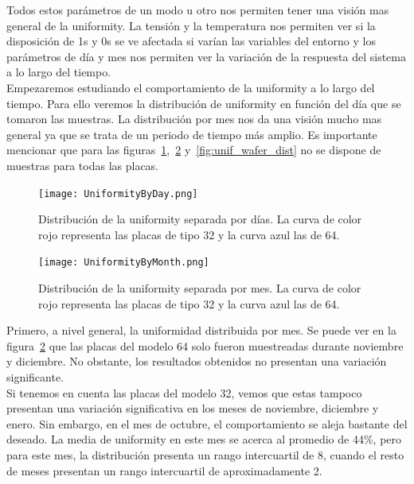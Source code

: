 \documentclass[spanish]{template/minim}
\begin{document}
Todos estos parámetros de un modo u otro nos permiten tener una visión mas general de la uniformity. La tensión y la temperatura nos permiten ver si la disposición de 1s y 0s se ve afectada si varían las variables del entorno y los parámetros de día y mes nos permiten ver la variación de la respuesta del sistema a lo largo del tiempo.\\

Empezaremos estudiando el comportamiento de la uniformity a lo largo del tiempo. Para ello veremos la distribución de uniformity en función del día que se tomaron las muestras. La distribución por mes nos da una visión mucho mas general ya que se trata de un periodo de tiempo más amplio. Es importante mencionar que para las figuras~\ref{fig:unif_day_dist},~\ref{fig:unif_month_dist} y~\ref{fig:unif_wafer_dist} no se dispone de muestras para todas las placas.\\

\begin{fullwidth}
\begin{figure}[H]
    \centering
    \texttt{[image: UniformityByDay.png]}
    \caption[Distribución de uniformity por día]{
            Distribución de la uniformity separada por días. La curva de color rojo representa las placas de tipo 32 y la curva azul las de 64.\label{fig:unif_day_dist}
        }
\end{figure}
\end{fullwidth}

\begin{fullwidth}
\begin{figure}[H]
    \centering
    \texttt{[image: UniformityByMonth.png]}
    \caption[Distribución de uniformity por mes]{
            Distribución de la uniformity separada por mes. La curva de color rojo representa las placas de tipo 32 y la curva azul las de 64.\label{fig:unif_month_dist}
        }
\end{figure}
\end{fullwidth}


Primero, a nivel general, la uniformidad distribuida por mes. Se puede ver en la figura~\ref{fig:unif_month_dist} que las placas del modelo 64 solo fueron muestreadas durante noviembre y diciembre. No obstante, los resultados obtenidos no presentan una variación significante.\\

Si tenemos en cuenta las placas del modelo 32, vemos que estas tampoco presentan una variación significativa en los meses de noviembre, diciembre y enero. Sin embargo, en el mes de octubre, el comportamiento se aleja bastante del deseado. La media de uniformity en este mes se acerca al promedio de 44\%, pero para este mes, la distribución presenta un rango intercuartil de 8, cuando el resto de meses presentan un rango intercuartil de aproximadamente 2.\\
\end{document}
